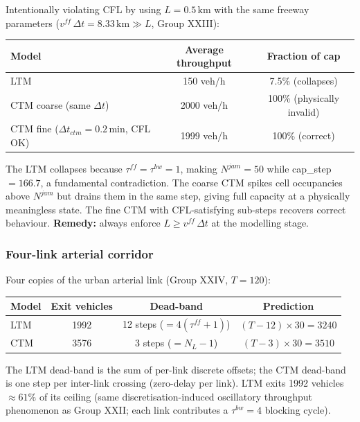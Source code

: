 Intentionally violating CFL by using $L = 0.5\,\text{km}$ with the
same freeway parameters ($v^{ff}\,\Delta t = 8.33\,\text{km} \gg L$,
Group XXIII):
\begin{center}
\begin{tabular}{lcc}
\toprule
Model & Average throughput & Fraction of cap \\
\midrule
LTM & 150 veh/h & 7.5\% (collapses) \\
CTM coarse (same $\Delta t$) & 2000 veh/h & 100\% (physically invalid) \\
CTM fine ($\Delta t_{ctm}=0.2\,\text{min}$, CFL OK) & 1999 veh/h & 100\% (correct) \\
\bottomrule
\end{tabular}
\end{center}
The LTM collapses because $\tau^{ff}=\tau^{bw}=1$, making $N^{jam}=50$
while cap\_step$=166.7$, a fundamental contradiction.
The coarse CTM spikes cell occupancies above $N^{jam}$ but drains them
in the same step, giving full capacity at a physically meaningless state.
The fine CTM with CFL-satisfying sub-steps recovers correct behaviour.
\textbf{Remedy:} always enforce $L \ge v^{ff}\,\Delta t$ at the modelling stage.

\subsubsection{Four-link arterial corridor}

Four copies of the urban arterial link (Group XXIV, $T = 120$):
\begin{center}
\begin{tabular}{lccc}
\toprule
Model & Exit vehicles & Dead-band & Prediction \\
\midrule
LTM & 1992 & 12 steps ($= 4(\tau^{ff}+1)$) & $(T-12)\times 30 = 3240$ \\
CTM & 3576 & 3 steps  ($= N_L - 1$)        & $(T-3)\times 30 = 3510$  \\
\bottomrule
\end{tabular}
\end{center}
The LTM dead-band is the sum of per-link discrete offsets; the CTM
dead-band is one step per inter-link crossing (zero-delay per link).
LTM exits 1992 vehicles $\approx 61\%$ of its ceiling (same
discretisation-induced oscillatory throughput phenomenon as Group XXII;
each link contributes a $\tau^{bw}=4$ blocking cycle).

